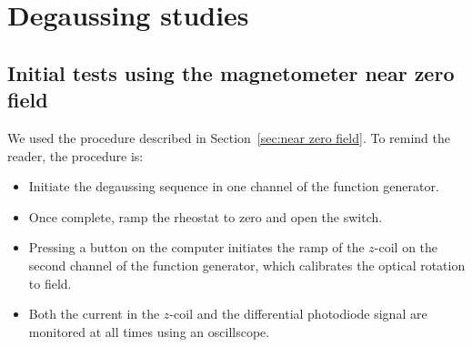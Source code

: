  
   
\section{Degaussing studies\label{sec:degaussing}}

\subsection{Initial tests using the magnetometer near zero field\label{sec:degauss-near-zerofield}}

   
  

We used the procedure described in Section~\ref{sec:near zero field}.
To remind the reader, the procedure is:
\begin{itemize}
\item Initiate the degaussing sequence in one channel of the function
  generator.
\item Once complete, ramp the rheostat to zero and open the switch.
\item Pressing a button on the computer initiates the ramp of the
  $z$-coil on the second channel of the function generator, which
  calibrates the optical rotation to field.
\item Both the current in the $z$-coil and the differential photodiode
  signal are monitored at all times using an oscillscope.
\end{itemize}


